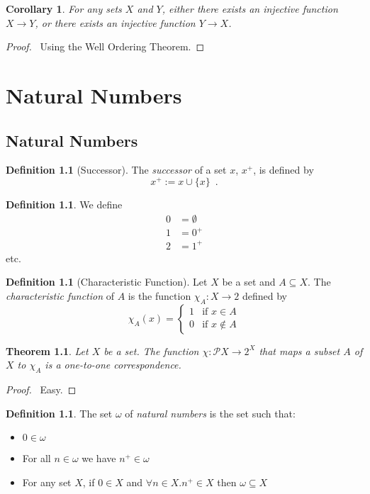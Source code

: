 \documentclass{report}
\let\qed\relax
\newtheorem{cor}{Corollary}[ax]
\newtheorem{thm}[ax]{Theorem}
\theoremstyle{definition}
\newtheorem{df}[ax]{Definition}
\begin{document}
\begin{cor}
For any sets $X$ and $Y$, either there exists an injective function $X \rightarrow Y$, or there exists an injective function $Y \rightarrow X$.
\end{cor}

\begin{proof}
\pf\ Using the Well Ordering Theorem. \qed
\end{proof}

\chapter{Natural Numbers}

\section{Natural Numbers}

\begin{df}[Successor]
The \emph{successor} of a set $x$, $x^+$, is defined by
\[ x^+ := x \cup \{x\} \enspace . \]
\end{df}

\begin{df}
We define
\begin{align*}
0 & = \emptyset \\
1 & = 0^+ \\
2 & = 1^+
\end{align*}
etc.
\end{df}

\begin{df}[Characteristic Function]
Let $X$ be a set and $A \subseteq X$. The \emph{characteristic function} of $A$ is the function $\chi_A : X \rightarrow 2$ defined by
\[ \chi_A(x) = \begin{cases}
1 & \text{if } x \in A \\
0 & \text{if } x \notin A
\end{cases} \]
\end{df}

\begin{thm}
Let $X$ be a set. The function $\chi : \mathcal{P} X \rightarrow 2^X$ that maps a subset $A$ of $X$ to $\chi_A$ is a one-to-one correspondence.
\end{thm}

\begin{proof}
\pf\ Easy. \qed
\end{proof}

\begin{df}
The set $\omega$ of \emph{natural numbers} is the set such that:
\begin{itemize}
\item $0 \in \omega$
\item For all $n \in \omega$ we have $n^+ \in \omega$
\item For any set $X$, if $0 \in X$ and $\forall n \in X. n^+ \in X$ then $\omega \subseteq X$
\end{itemize}
\end{df}
\end{document}
